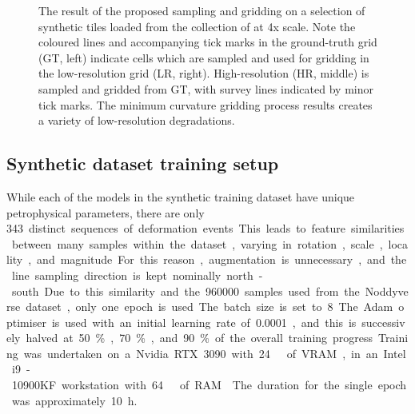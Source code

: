 \documentclass[manuscript.tex]{subfiles}
\begin{document}
\begin{figure}[hbt]
    \caption[Low-resolution geophysics grids]{
        The result of the proposed sampling and gridding on a selection of synthetic tiles loaded from the collection of \parencite{jessellNoddyverseMassiveData2022} at 4x scale.
        Note the coloured lines and accompanying tick marks in the ground-truth grid (GT, left) indicate cells which are sampled and used for gridding in the low-resolution grid (LR, right).
        High-resolution (HR, middle) is sampled and gridded from GT, with survey lines indicated by minor tick marks.
        The minimum curvature gridding process results creates a variety of low-resolution degradations.
    }
    \label{fig:lrdata}
\end{figure}

\subsection{Synthetic dataset training setup}
While each of the models in the synthetic training dataset have unique petrophysical parameters, there are only \qty{343} distinct sequences of deformation events.
This leads to feature similarities between many samples within the dataset, varying in rotation, scale, locality, and magnitude.
For this reason, augmentation is unnecessary, and the line sampling direction is kept nominally north-south.
Due to this similarity and the \qty{960000} samples used from the Noddyverse dataset, only one epoch is used.
The batch size is set to 8. The Adam optimiser is used with an initial learning rate of \num{0.0001}, and this is successively halved at 50\%, 70\%, and 90\% of the overall training progress.
Training was undertaken on a Nvidia RTX 3090 with \qty{24}{\giga\byte} of VRAM, in an Intel i9-10900KF workstation with \qty{64}{\giga\byte} of RAM\@.
The duration for the single epoch was approximately \qty{10}{\hour}.

\end{document}
